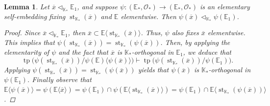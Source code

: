 \documentclass{amsart}
\newtheorem{lemma}[theorem]{Lemma}
\theoremstyle{remark}
\theoremstyle{definition}
\theoremstyle{plain}
\newcommand{\bE}{\mathbb E}
\newcommand{\bK}{\mathbb K}
\newcommand{\cO}{\mathcal O}
\DeclareMathOperator{\std}{\mathrm{st}}
\DeclareMathOperator{\tp}{\mathrm{tp}}
\theoremstyle{plain}
\begin{document}
\begin{lemma}\label{lem:invariance}
    Let $\overline{x} \triangleleft_{\bK_*}\bE_1$, and suppose $\psi: (\bE_*, \cO_*)\to (\bE_*, \cO_*)$ is an elementary self-embedding fixing $\std_{\bK_*}(\overline{x})$ and $\bE$ elementwise. Then $\psi(\overline{x}) \triangleleft_{\bK_*}\psi(\bE_1)$.
    \begin{proof}
        Since $\overline{x} \triangleleft_{\bK_*}\bE_1$, then $\overline{x} \subset \bE\langle \std_{\bK_*}(\overline{x})\rangle$. Thus, $\psi$ also fixes $\overline{x}$ elementwise. This implies that $\psi(\std_{\bK_*}(\overline{x}))=\std_{\bK_*}(\psi (\overline{x}))$. Then, by applying the elementarity of $\psi$ and the fact that $\overline{x}$ is $\bK_*$-orthogonal in $\bE_1$, we deduce that
        \[\tp\big(\psi(\std_{\bK_*}(\overline{x})) / \psi(\bE)\langle \psi(\overline{x})\rangle\big) \vdash \tp\big(\psi(\std_{\bK_*}(\overline{x})) /\psi(\bE_1)\big).\]
        Applying $\psi(\std_{\bK_*}(\overline{x}))=\std_{\bK_*}(\psi (\overline{x}))$ yields that $\psi(\overline{x})$ is $\bK_*$-orthogonal in $\psi(\bE_1)$. Finally observe that $\bE\langle \psi(\overline{x}) \rangle= \psi(\bE \langle \overline{x} \rangle) = \psi(\bE_1) \cap \psi(\bE \langle \std_{\bK_*}(\overline{x})\rangle) = \psi(\bE_1) \cap \bE \langle \std_{\bK_*}(\psi(\overline{x})) \rangle$.
    \end{proof}
\end{lemma}
\end{document}
